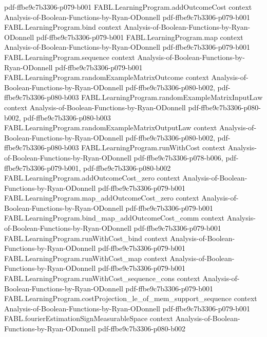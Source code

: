 \begin{theorem}
{    pdf-ffbe9c7b3306-p079-b001}
\proofstep
  {FABL.LearningProgram.addOutcomeCost}
  {context}
  {Analysis-of-Boolean-Functions-by-Ryan-ODonnell}
  {pdf-ffbe9c7b3306-p079-b001}
\proofstep
  {FABL.LearningProgram.bind}
  {context}
  {Analysis-of-Boolean-Functions-by-Ryan-ODonnell}
  {pdf-ffbe9c7b3306-p079-b001}
\proofstep
  {FABL.LearningProgram.map}
  {context}
  {Analysis-of-Boolean-Functions-by-Ryan-ODonnell}
  {pdf-ffbe9c7b3306-p079-b001}
\proofstep
  {FABL.LearningProgram.sequence}
  {context}
  {Analysis-of-Boolean-Functions-by-Ryan-ODonnell}
  {pdf-ffbe9c7b3306-p079-b001}
\proofstep
  {FABL.LearningProgram.randomExampleMatrixOutcome}
  {context}
  {Analysis-of-Boolean-Functions-by-Ryan-ODonnell}
  {pdf-ffbe9c7b3306-p080-b002,
    pdf-ffbe9c7b3306-p080-b003}
\proofstep
  {FABL.LearningProgram.randomExampleMatrixInputLaw}
  {context}
  {Analysis-of-Boolean-Functions-by-Ryan-ODonnell}
  {pdf-ffbe9c7b3306-p080-b002,
    pdf-ffbe9c7b3306-p080-b003}
\proofstep
  {FABL.LearningProgram.randomExampleMatrixOutputLaw}
  {context}
  {Analysis-of-Boolean-Functions-by-Ryan-ODonnell}
  {pdf-ffbe9c7b3306-p080-b002,
    pdf-ffbe9c7b3306-p080-b003}
\proofstep
  {FABL.LearningProgram.runWithCost}
  {context}
  {Analysis-of-Boolean-Functions-by-Ryan-ODonnell}
  {pdf-ffbe9c7b3306-p078-b006,
    pdf-ffbe9c7b3306-p079-b001,
    pdf-ffbe9c7b3306-p080-b002}
\proofstep
  {FABL.LearningProgram.addOutcomeCost_zero}
  {context}
  {Analysis-of-Boolean-Functions-by-Ryan-ODonnell}
  {pdf-ffbe9c7b3306-p079-b001}
\proofstep
  {FABL.LearningProgram.map_addOutcomeCost_zero}
  {context}
  {Analysis-of-Boolean-Functions-by-Ryan-ODonnell}
  {pdf-ffbe9c7b3306-p079-b001}
\proofstep
  {FABL.LearningProgram.bind_map_addOutcomeCost_comm}
  {context}
  {Analysis-of-Boolean-Functions-by-Ryan-ODonnell}
  {pdf-ffbe9c7b3306-p079-b001}
\proofstep
  {FABL.LearningProgram.runWithCost_bind}
  {context}
  {Analysis-of-Boolean-Functions-by-Ryan-ODonnell}
  {pdf-ffbe9c7b3306-p079-b001}
\proofstep
  {FABL.LearningProgram.runWithCost_map}
  {context}
  {Analysis-of-Boolean-Functions-by-Ryan-ODonnell}
  {pdf-ffbe9c7b3306-p079-b001}
\proofstep
  {FABL.LearningProgram.runWithCost_sequence_cons}
  {context}
  {Analysis-of-Boolean-Functions-by-Ryan-ODonnell}
  {pdf-ffbe9c7b3306-p079-b001}
\proofstep
  {FABL.LearningProgram.costProjection_le_of_mem_support_sequence}
  {context}
  {Analysis-of-Boolean-Functions-by-Ryan-ODonnell}
  {pdf-ffbe9c7b3306-p079-b001}
\proofstep
  {FABL.fourierEstimationSignMeasurableSpace}
  {context}
  {Analysis-of-Boolean-Functions-by-Ryan-ODonnell}
  {pdf-ffbe9c7b3306-p080-b002}
\proofstep

\end{theorem}
